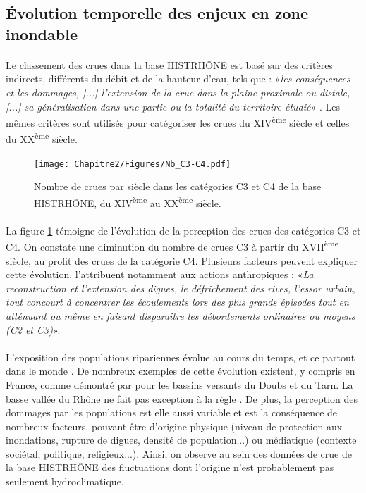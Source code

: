 	\subsection{Évolution temporelle des enjeux en zone inondable}
	\label{subsec:EvolVuln}
	
	\paragraph{} Le classement des crues dans la base HISTRHÔNE est basé sur des critères indirects, différents du débit et de la hauteur d'eau, tels que : «\textit{les conséquences et les dommages, [...] l'extension de la crue dans la plaine proximale ou distale, [...] sa généralisation dans une partie ou la totalité du territoire étudié}» \citep{pichard_sept_2014}. Les mêmes critères sont utilisés pour catégoriser les crues du XIV\textsuperscript{ème} siècle et celles du XX\textsuperscript{ème} siècle. 
	
	\begin{figure}[h]
	\centering
		\texttt{[image: Chapitre2/Figures/Nb\_C3-C4.pdf]}
        \caption{Nombre de crues par siècle dans les catégories C3 et C4 de la base HISTRHÔNE, du XIV\textsuperscript{ème} au XX\textsuperscript{ème} siècle.}
		\label{fig:Nb_C3C4}
	\end{figure}	
	
	\paragraph{} La figure \ref{fig:Nb_C3C4} témoigne de l'évolution de la perception des crues des catégories C3 et C4. On constate une diminution du nombre de crues C3 à partir du XVII\textsuperscript{ème} siècle, au profit des crues de la catégorie C4. Plusieurs facteurs peuvent expliquer cette évolution. \citet{pichard_sept_2014} l'attribuent notamment aux actions anthropiques : «\textit{La reconstruction et l'extension des digues, le défrichement des rives, l'essor urbain, tout concourt à concentrer les écoulements lors des plus grands épisodes tout en atténuant ou même en faisant disparaître les débordements ordinaires ou moyens (C2 et C3)}». 
	
	\paragraph{} L'exposition des populations ripariennes évolue au cours du temps, et ce partout dans le monde \citep{kron_flood_2002}. De nombreux exemples de cette évolution existent, y compris en France, comme démontré par \citet{boudou_assessing_2016} pour les bassins versants du Doubs et du Tarn. La basse vallée du Rhône ne fait pas exception à la règle \citep{piegay_observatoire_2022}. De plus, la perception des dommages par les populations est elle aussi variable et est la conséquence de nombreux facteurs, pouvant être d'origine physique (niveau de protection aux inondations, rupture de digues, densité de population...) ou médiatique (contexte sociétal, politique, religieux...). Ainsi, on observe au sein des données de crue de la base HISTRHÔNE des fluctuations dont l'origine n'est probablement pas seulement hydroclimatique. 
	
